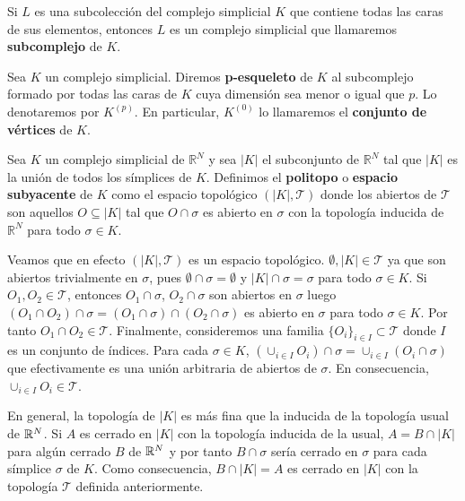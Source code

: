 \begin{definicion}
	Si $L$ es una subcolección del complejo simplicial $K$ que contiene todas las caras
	de sus elementos, entonces $L$ es un complejo simplicial que llamaremos
	\textbf{subcomplejo} de $K$.
\end{definicion}
\begin{definicion}
	Sea $K$ un complejo simplicial. Diremos \textbf{p-esqueleto} de $K$ al subcomplejo
	formado por todas las caras de $K$ cuya dimensión sea menor o igual que $p$.
	Lo denotaremos por $K^{(p)}$. En particular, $K^{(0)}$ lo llamaremos el
	\textbf{conjunto de vértices} de $K$.
\end{definicion}
\begin{definicion}
	Sea $K$ un complejo simplicial de $\mathbb{R}^{N}$ y sea $|K|$ el subconjunto de
	$\mathbb{R}^{N}$ tal que $|K|$ es la unión de todos los símplices de $K$.
	Definimos el \textbf{politopo} o \textbf{espacio subyacente} de $K$ como el
	espacio topológico $(|K|, \mathcal{T})$ donde los abiertos de $\mathcal{T}$
	son aquellos $O \subseteq |K|$ tal que $O \cap \sigma$ es abierto en $\sigma$
	con la topología inducida de $\mathbb{R}^{N}$ para todo $\sigma \in K$.
\end{definicion}

Veamos que en efecto $(|K|, \mathcal{T})$ es un espacio topológico.
$\emptyset, |K| \in \mathcal{T}$ ya que son abiertos trivialmente en $\sigma$, pues
$\emptyset \cap \sigma = \emptyset$ y $|K| \cap \sigma = \sigma$ para todo $\sigma
\in K$. Si $O_{1}, O_{2} \in \mathcal{T}$, entonces $O_{1} \cap \sigma$,
$O_{2} \cap \sigma$ son abiertos en $\sigma$ luego
$(O_{1} \cap O_{2}) \cap \sigma = (O_{1} \cap \sigma) \cap (O_{2} \cap \sigma)$
es abierto en $\sigma$ para todo $\sigma \in K$. Por tanto $O_{1} \cap O_{2} \in
\mathcal{T}$. Finalmente, consideremos una familia $\{O_{i}\}_{i \in I}\subset \mathcal{T}$
donde $I$ es un conjunto de índices. Para cada $\sigma \in K$, $(\cup_{i \in I}O_{i}
) \cap \sigma = \cup_{i \in I}(O_{i} \cap \sigma)$ que efectivamente es una unión
arbitraria de abiertos de $\sigma$. En consecuencia, $\cup_{i \in I}O_{i} \in \mathcal{T}$.

En general, la topología de $|K|$ es más fina que la inducida de la topología
usual de $\mathbb{R}^{N}$. Si $A$ es cerrado en $|K|$ con la topología inducida de la usual,
$A=B \cap |K|$ para algún cerrado $B$ de $\mathbb{R}^{N}$ y por tanto $B \cap \sigma$
sería cerrado en $\sigma$ para cada símplice $\sigma$ de $K$. Como consecuencia,
$B \cap |K|=A$ es cerrado en $|K|$ con la topología $\mathcal{T}$ definida
anteriormente.

